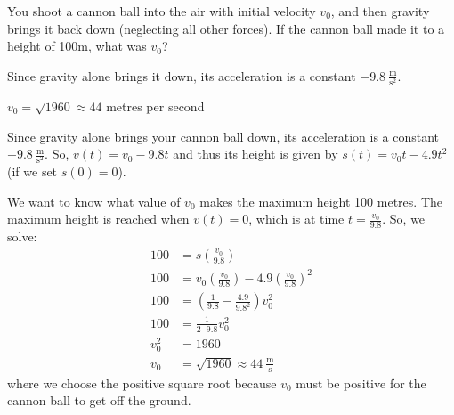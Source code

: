 \begin{Mquestion}
You shoot a cannon ball into the air
with initial velocity $v_0$, and then gravity brings it back down (neglecting all other forces). If the cannon ball made it to a height of 100m, what was $v_0$?
\end{Mquestion}
\begin{hint}
Since gravity alone brings it down, its acceleration is a constant $-9.8~\frac{\mathrm{m}}{\mathrm{s}^2}$.
\end{hint}
\begin{answer}
$v_0=\sqrt{1960}\approx 44$ metres per second
\end{answer}
\begin{solution}
Since gravity alone brings your cannon ball down, its acceleration is a constant $-9.8~\frac{\mathrm{m}}{\mathrm{s}^2}$. So, $v(t)=v_0-9.8t$ and thus its height is given by $s(t)=v_0t-4.9t^2$ (if we set $s(0)=0$).

We want to know what value of $v_0$ makes the maximum height 100 metres. The maximum height is reached when $v(t)=0$, which is at time $t=\frac{v_0}{9.8}$. So, we solve:
\begin{align*}
100&=s\left(\frac{v_0}{9.8}\right)\\
100&=v_0\left(\frac{v_0}{9.8}\right)-4.9\left(\frac{v_0}{9.8}\right)^2\\
100&=\left(\frac{1}{9.8}-\frac{4.9}{9.8^2}\right)v_0^2\\
100&=\frac{1}{2\cdot 9.8}v_0^2\\
v_0^2&=1960\\
v_0&=\sqrt{1960}\approx 44~\frac{\mathrm{m}}{\mathrm{s}}
\end{align*}
where we choose the positive square root because $v_0$ must be positive for the cannon ball to get off the ground.
\end{solution}

